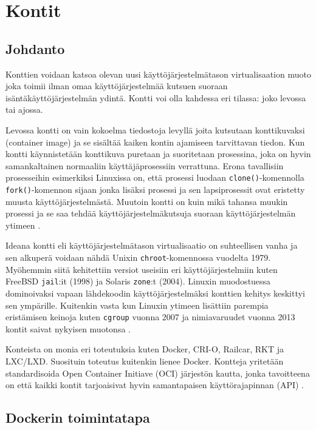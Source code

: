 \documentclass[finnish,gradu]{tktltiki3}
\begin{document}
    \section{Kontit}
    
    \subsection{Johdanto}
    
    Konttien voidaan katsoa olevan uusi käyttöjärjestelmätason virtualisaation muoto joka toimii ilman omaa käyttöjärjestelmää kutsuen suoraan isäntäkäyttöjärjestelmän ydintä. Kontti voi olla kahdessa eri tilassa: joko levossa tai ajossa.
    
    Levossa kontti on vain kokoelma tiedostoja levyllä joita kutsutaan konttikuvaksi (container image) ja se sisältää kaiken kontin ajamiseen tarvittavan tiedon. Kun kontti käynnistetään konttikuva puretaan ja suoritetaan prosessina, joka on hyvin samankaltainen normaaliin käyttäjäprosessiin verrattuna. Erona tavallisiin prosesseihin esimerkiksi Linuxissa on, että prosessi luodaan \texttt{clone()}-komennolla \texttt{fork()}-komennon sijaan jonka lisäksi prosessi ja sen lapsiprosessit ovat eristetty muusta käyttöjärjestelmästä. Muutoin kontti on kuin mikä tahansa muukin prosessi ja se saa tehdää käyttöjärjestelmäkutsuja suoraan käyttöjärjestelmän ytimeen \cite{docker}.
    
    Ideana kontti eli käyttöjärjestelmätason virtualisaatio on suhteellisen vanha ja sen alkuperä voidaan nähdä Unixin \texttt{chroot}-komennossa vuodelta 1979. Myöhemmin siitä kehitettiin versiot useisiin eri käyttöjärjestelmiin kuten FreeBSD \texttt{jail}:it (1998) ja Solaris \texttt{zone}:t (2004). Linuxin muodostuessa dominoivaksi vapaan lähdekoodin käyttöjärjestelmäksi konttien kehitys keskittyi sen ympärille. Kuitenkin vasta kun Linuxin ytimeen lisättiin parempia eristämisen keinoja kuten \texttt{cgroup} vuonna 2007 ja nimiavaruudet vuonna 2013 kontit saivat nykyisen muotonsa \cite{lxc-docker-kubernetes}.
    
    Konteista on monia eri toteutuksia kuten Docker, CRI-O, Railcar, RKT ja LXC/LXD. Suosituin toteutus kuitenkin lienee Docker. Kontteja yritetään standardisoida Open Container Initiave (OCI) järjestön kautta, jonka tavoitteena on että kaikki kontit tarjoaisivat hyvin samantapaisen käyttörajapinnan (API) \cite{practical-container}.
    
    \subsection{Dockerin toimintatapa}
    
\end{document}
